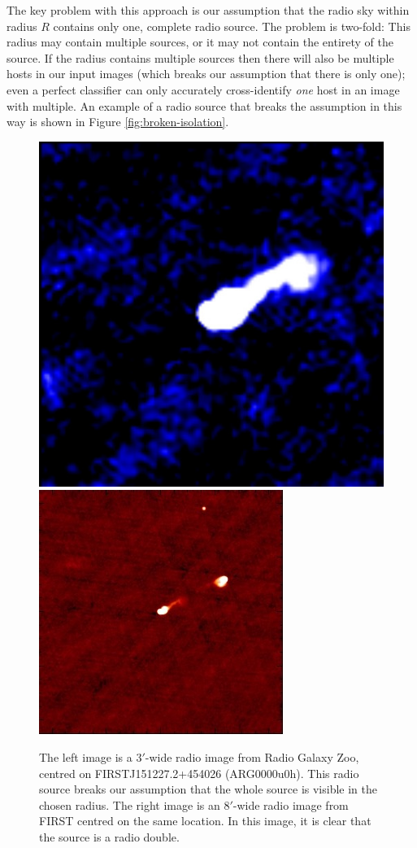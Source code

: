 \documentclass[fleqn,usenatbib,usedcolumn]{mnras}
\begin{document}
    The key problem with this approach is our assumption that the radio sky
    within radius $R$ contains only one, complete radio source. The problem is
    two-fold: This radius may contain multiple sources, or it may not contain
    the entirety of the source. If the radius contains multiple sources then
    there will also be multiple hosts in our input images (which breaks our
    assumption that there is only one); even a perfect classifier can only
    accurately cross-identify \emph{one} host in an image with multiple. An
    example of a radio source that breaks the assumption in this way is shown
    in Figure \ref{fig:broken-isolation}.

    \begin{figure}
      \centering
      \includegraphics[width=0.45\linewidth]{images/ARG0000u0h_radio.jpg}
      \includegraphics[width=0.45\linewidth]{images/ARG0000u0h_first.jpg}
      \caption{The left image is a $3'$-wide radio image from Radio Galaxy
        Zoo, centred on FIRSTJ151227.2+454026 (ARG0000u0h). This radio source
        breaks our assumption that the whole source is visible in the chosen
        radius. The right image is an $8'$-wide radio image from FIRST centred
        on the same location. In this image, it is clear that the source is a
        radio double.}
      \label{fig:broken-contains}
    \end{figure}
\end{document}
